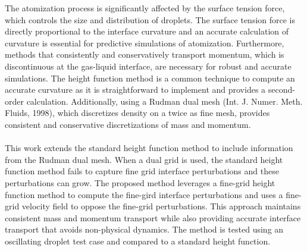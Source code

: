 
The atomization process is significantly affected by the surface tension force, which controls the size and distribution of droplets. The surface tension force is directly proportional to the interface curvature and an accurate calculation of curvature is essential for predictive simulations of atomization. Furthermore, methods that consistently and conservatively transport momentum, which is discontinuous at the gas-liquid interface, are necessary for robust and accurate simulations. The height function method is a common technique to compute an accurate curvature as it is straightforward to implement and provides a second-order calculation. Additionally, using a Rudman dual mesh (Int. J. Numer. Meth. Fluids, 1998),  which discretizes density on a twice as fine mesh, provides consistent and conservative discretizations of mass and momentum.\\
\\
\indent This work extends the standard height function method to include information from the Rudman dual mesh.  When a dual grid is used, the standard height function method fails to capture fine grid interface perturbations and these perturbations can grow.  The proposed method leverages a fine-grid height function method to compute the fine-gird interface perturbations and uses a fine-grid velocity field to oppose the fine-grid perturbations. This approach maintains consistent mass and momentum transport while also providing accurate interface transport that avoids non-physical dynamics. The method is tested using an oscillating droplet test case and compared to a standard height function. 